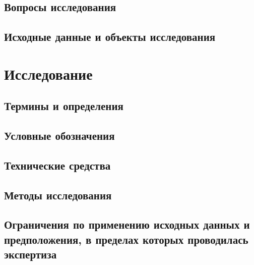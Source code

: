 \subsection{Вопросы исследования}


\subsection{Исходные данные и объекты исследования}


\printbibliography 

\section{Исследование}

\subsection{Термины и определения}


\subsection{Условные обозначения}


\subsection{Технические средства}


\subsection{Методы исследования}


\subsection{Ограничения по применению исходных данных и предположения, в пределах которых проводилась экспертиза}
